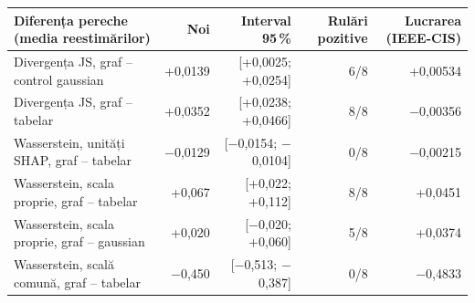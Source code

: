 \begin{tabular}{lrrrr}
\toprule
Diferența pereche (media reestimărilor) & Noi & Interval 95\,\% & Rulări pozitive & Lucrarea (IEEE-CIS) \\
\midrule
Divergența JS, graf -- control gaussian & +0,0139 & [+0,0025; +0,0254] & 6/8 & +0,00534 \\
Divergența JS, graf -- tabelar & +0,0352 & [+0,0238; +0,0466] & 8/8 & $-$0,00356 \\
Wasserstein, unități SHAP, graf -- tabelar & $-$0,0129 & [$-$0,0154; $-$0,0104] & 0/8 & $-$0,00215 \\
Wasserstein, scala proprie, graf -- tabelar & +0,067 & [+0,022; +0,112] & 8/8 & +0,0451 \\
Wasserstein, scala proprie, graf -- gaussian & +0,020 & [$-$0,020; +0,060] & 5/8 & +0,0374 \\
Wasserstein, scală comună, graf -- tabelar & $-$0,450 & [$-$0,513; $-$0,387] & 0/8 & $-$0,4833 \\
\bottomrule
\end{tabular}
